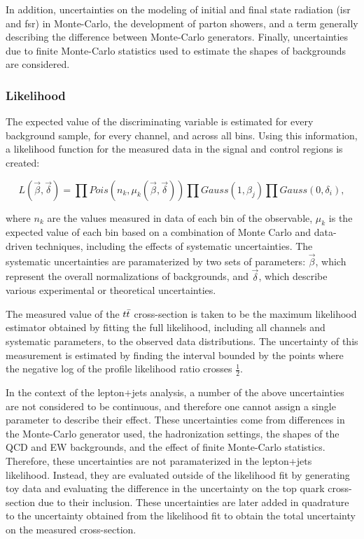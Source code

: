 In addition, uncertainties on the modeling of initial and final state radiation (isr and fsr) in Monte-Carlo, the development of parton showers, and a term generally describing the difference between Monte-Carlo generators.
Finally, uncertainties due to finite Monte-Carlo statistics used to estimate the shapes of backgrounds are considered.

%


\subsubsection{Likelihood}

The expected value of the discriminating variable is estimated for every background sample, for every channel, and across all bins.
Using this information, a likelihood function for the measured data in the signal and control regions is created:

\begin{equation}
  L(\vec{\beta}, \vec{\delta}) = \prod Pois(n_{k},\mu_{k}(\vec{\beta},\vec{\delta})) \prod Gauss(1, \beta_j) \prod Gauss( 0, \delta_i),
\end{equation}

where $n_k$ are the values measured in data of each bin of the observable, $\mu_k$ is the expected value of each bin based on a combination of Monte Carlo and data-driven techniques, including the effects of systematic uncertainties.
The systematic uncertainties are paramaterized by two sets of parameters: $\vec{\beta}$, which represent the overall normalizations of backgrounds, and $\vec{\delta}$, which describe various experimental or theoretical uncertainties.

The measured value of the $t\bar{t}$ cross-section is taken to be the maximum likelihood estimator obtained by fitting the full likelihood, including all channels and systematic parameters, to the observed data distributions.
The uncertainty of this measurement is estimated by finding the interval bounded by the points where the negative log of the profile likelihood ratio crosses $\frac{1}{2}$.

In the context of the lepton$+$jets analysis, a number of the above uncertainties are not considered to be continuous, and therefore one cannot assign a single parameter to describe their effect.
These uncertainties come from differences in the Monte-Carlo generator used, the hadronization settings, the shapes of the QCD and EW backgrounds, and the effect of finite Monte-Carlo statistics.
Therefore, these uncertainties are not paramaterized in the lepton+jets likelihood.
Instead, they are evaluated outside of the likelihood fit by generating toy data and evaluating the difference in the uncertainty on the top quark cross-section due to their inclusion.
These uncertainties are later added in quadrature to the uncertainty obtained from the likelihood fit to obtain the total uncertainty on the measured cross-section.


